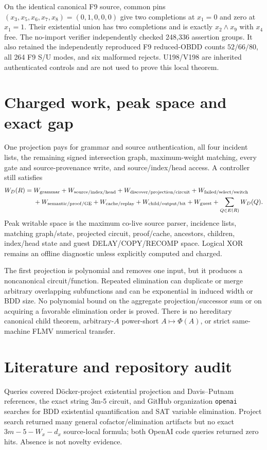 \documentclass[11pt]{article}
\begin{document}
On the identical canonical F9 source, common pins
$(x_3,x_5,x_6,x_7,x_8)=(0,1,0,0,0)$ give two completions at $x_1=0$ and
zero at $x_1=1$.  Their existential union has two completions and is exactly
$x_2\wedge x_9$ with $x_4$ free.  The no-import verifier independently
checked 248,336 assertion groups.  It also retained the independently
reproduced F9 reduced-OBDD counts $52/66/80$, all 264 F9 S/U modes, and six
malformed rejects.  U198/V198 are inherited authenticated controls and are
not used to prove this local theorem.

\section{Charged work, peak space and exact gap}

One projection pays for grammar and source authentication, all four incident
lists, the remaining signed intersection graph, maximum-weight matching,
every gate and source-provenance write, and source/index/head access.  A
controller still satisfies
\begin{align*}
W_D(R)={}&W_{\rm grammar}+W_{\rm source/index/head}
+W_{\rm discover/projection/circuit}+W_{\rm failed/select/switch}\\
&+W_{\rm semantic/proof/GE}+W_{\rm cache/replay}
+W_{\rm child/output/bit}+W_{\rm guest}
+\sum_{Q\in E(R)}W_D(Q).
\end{align*}
Peak writable space is the maximum co-live source parser, incidence lists,
matching graph/state, projected circuit, proof/cache, ancestors, children,
index/head state and guest DELAY/COPY/RECOMP space.  Logical XOR remains an
offline diagnostic unless explicitly computed and charged.

The first projection is polynomial and removes one input, but it produces a
noncanonical circuit/function.  Repeated elimination can duplicate or merge
arbitrary overlapping subfunctions and can be exponential in induced width
or BDD size.  No polynomial bound on the aggregate projection/successor sum
or on acquiring a favorable elimination order is proved.  There is no
hereditary canonical child theorem, arbitrary-$A$ power-short
$A\mapsto\Phi(A)$, or strict same-machine FLMV numerical transfer.

\section{Literature and repository audit}

Queries covered D\"ocker-project existential projection and Davis--Putnam
references, the exact string 3m-5 circuit, and GitHub organization
\texttt{openai} searches for BDD existential quantification and SAT variable
elimination.  Project search returned many general cofactor/elimination
artifacts but no exact $3m-5-W_x-d_x$ source-local formula; both OpenAI code
queries returned zero hits.  Absence is not novelty evidence.
\end{document}
